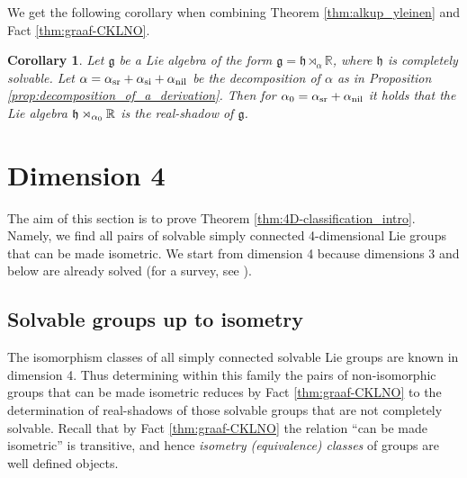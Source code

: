\documentclass[a4paper,12pt]{amsart}
\theoremstyle{plain}
\theoremstyle{definition}
\theoremstyle{plain}
\newtheorem{seur}[maar]{Corollary}
\theoremstyle{remark}
\newcommand{\laina}[1]{``#1''}
\begin{document}
We get the following corollary when combining Theorem \ref{thm:alkup_yleinen} and Fact \ref{thm:graaf-CKLNO}.
\begin{seur} \label{prop:R-shadow-and-real-part-reduction}
	Let \( \mathfrak{g} \) be a Lie algebra 
	of the form \( \mathfrak{g} = \mathfrak{h} \rtimes_\alpha \mathbb{R} \), where \( \mathfrak{h} \) is completely solvable. Let \( \alpha = \alpha_\mathrm{sr} + \alpha_\mathrm{si} + \alpha_\mathrm{nil} \) be the decomposition of \( \alpha \) as in Proposition \ref{prop:decomposition_of_a_derivation}. Then for \( {\alpha_0} =  \alpha_\mathrm{sr} + \alpha_\mathrm{nil}\) it holds that the Lie algebra \( \mathfrak{h} \rtimes_{\alpha_0} \mathbb{R} \) is the real-shadow of 
	\( \mathfrak{g} \).
\end{seur}








\section{Dimension 4}



\label{sec:4D}

The aim of this section is to prove Theorem \ref{thm:4D-classification_intro}. Namely, we find all pairs of  solvable simply connected 4-dimensional Lie groups that can be made isometric. We start from dimension 4 because dimensions 3 and below are already solved
(for a survey, see \cite{avain:fasslerledonne}).  

\subsection{Solvable groups up to isometry}
The isomorphism classes of all simply connected solvable Lie groups are known in dimension 4. Thus determining within this family the pairs of non-isomorphic groups that can be made isometric reduces by
Fact \ref{thm:graaf-CKLNO} to the determination of real-shadows of those solvable groups that are not completely solvable. 
Recall that by Fact \ref{thm:graaf-CKLNO} the relation \laina{can be made isometric} is transitive, and hence \emph{isometry (equivalence) classes} of groups are well defined objects.
\end{document}
